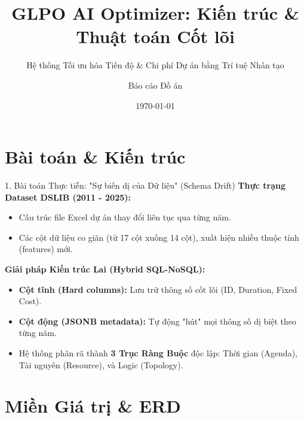 \documentclass[aspectratio=169]{beamer}
\title[GLPO AI Optimizer]{GLPO AI Optimizer: Kiến trúc \& Thuật toán Cốt lõi}
\subtitle{Hệ thống Tối ưu hóa Tiến độ \& Chi phí Dự án bằng Trí tuệ Nhân tạo}
\author{Báo cáo Đồ án}
\institute[Đại học]{Khoa Công nghệ Thông tin}
\date{\today}
\begin{document}
\begin{frame}
    \titlepage
\end{frame}

\section{Bài toán \& Kiến trúc}

\begin{frame}{1. Bài toán Thực tiễn: "Sự biến dị của Dữ liệu" (Schema Drift)}
    \textbf{Thực trạng Dataset DSLIB (2011 - 2025):}
    \begin{itemize}
        \item Cấu trúc file Excel dự án thay đổi liên tục qua từng năm.
        \item Các cột dữ liệu co giãn (từ 17 cột xuống 14 cột), xuất hiện nhiều thuộc tính (features) mới.
    \end{itemize}
    \vspace{0.3cm}
    \textbf{Giải pháp Kiến trúc Lai (Hybrid SQL-NoSQL):}
    \begin{itemize}
        \item \textbf{Cột tĩnh (Hard columns):} Lưu trữ thông số cốt lõi (ID, Duration, Fixed Cost).
        \item \textbf{Cột động (JSONB metadata):} Tự động "hút" mọi thông số dị biệt theo từng năm.
        \item Hệ thống phân rã thành \textbf{3 Trục Ràng Buộc} độc lập: Thời gian (Agenda), Tài nguyên (Resource), và Logic (Topology).
    \end{itemize}
\end{frame}

\section{Miền Giá trị \& ERD}
\end{document}
